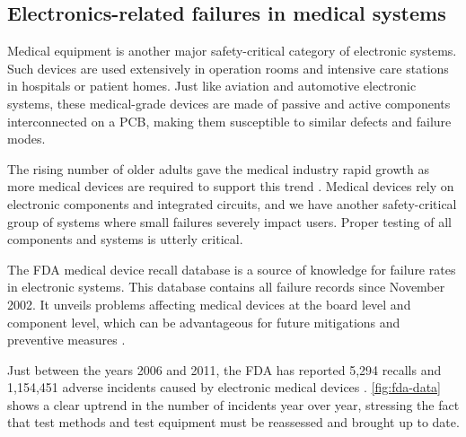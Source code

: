 
\subsection{Electronics-related failures in medical systems}
\label{subsec:elec-failures-in-medical}

Medical equipment is another major safety-critical category of electronic
systems.
Such devices are used extensively in operation rooms and intensive care
stations in hospitals or patient homes. Just like aviation and automotive
electronic systems, these medical-grade devices are made of passive and active
components interconnected on a \ac{PCB}, making them susceptible to similar
defects and failure modes.

The rising number of older adults gave the medical industry rapid growth as more
medical devices are required to support this trend \autocite{hedge}.
Medical devices rely on electronic components and integrated circuits, and we
have another safety-critical group of systems where small failures severely
impact users.
Proper testing of all components and systems is utterly critical.

The \ac{FDA} medical device recall database is a source of knowledge for failure
rates in electronic systems.
This database contains all failure records since November 2002.
It unveils problems affecting medical devices at the board level and
component level, which can be advantageous for future mitigations and
preventive measures \autocite{fda-med-recalls}.

Just between the years 2006 and 2011, the FDA has reported 5,294 recalls and
1,154,451 adverse incidents caused by electronic medical
devices \autocite{alemzadeh}.
\autoref{fig:fda-data} shows a clear uptrend in the number of incidents year
over year, stressing the fact that test methods and test equipment must be
reassessed and brought up to date.

